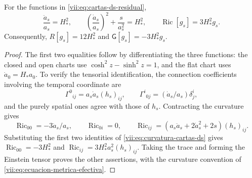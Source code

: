 \begin{lemma}
\label{vii:lem:curvatura-cartas-ds}
For the functions in \eqref{vii:eq:cartas-ds-residual},
\begin{equation}
 \frac{\ddot a_s}{a_s}=H_*^2,\qquad
 \left(\frac{\dot a_s}{a_s}\right)^2+\frac{s}{a_s^2}=H_*^2,
 \qquad
 \operatorname{Ric}[g_s]=3H_*^2g_s.
 \label{vii:eq:curvatura-cartas-ds}
\end{equation}
Consequently, \(R[g_s]=12H_*^2\) and
\(\mathsf G[g_s]=-3H_*^2g_s\).
\end{lemma}
\begin{proof}
The first two equalities follow by differentiating the three functions:
the closed and open charts use
\(\cosh^2z-\sinh^2z=1\), and the flat chart uses
\(\dot a_0=H_*a_0\). To verify the tensorial identification,
the connection coefficients involving the temporal coordinate are
\[
 \Gamma^0{}_{ij}=a_s\dot a_s(h_s)_{ij},\qquad
 \Gamma^i{}_{0j}=(\dot a_s/a_s)\delta^i_j,
\]
and the purely spatial ones agree with those of \(h_s\).
Contracting the curvature gives
\[
 \operatorname{Ric}_{00}=-3\ddot a_s/a_s,\qquad
 \operatorname{Ric}_{0i}=0,\qquad
 \operatorname{Ric}_{ij}
  =(a_s\ddot a_s+2\dot a_s^2+2s)(h_s)_{ij}.
\]
Substituting the first two identities of
\eqref{vii:eq:curvatura-cartas-ds} gives
\(\operatorname{Ric}_{00}=-3H_*^2\) and
\(\operatorname{Ric}_{ij}=3H_*^2a_s^2(h_s)_{ij}\).
Taking the trace and forming the Einstein tensor proves the other
assertions, with the curvature convention of
\eqref{vii:eq:ecuacion-metrica-efectiva}.
\end{proof}


